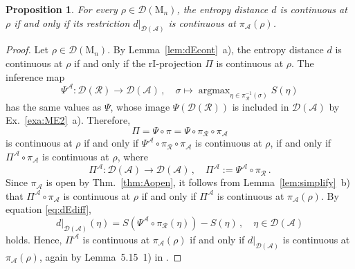 \documentclass[a4paper,11pt,reqno]{amsart}
\newcommand{\M}{\mathrm{M}}
\newcommand{\cA}{\mathcal{A}}
\newcommand{\cD}{\mathcal{D}}
\newcommand{\cR}{\mathcal{R}}
\DeclareMathOperator\argmax{argmax}
\newtheorem{prop}[thm]{Proposition}
\theoremstyle{definition}
\theoremstyle{remark}
\numberwithin{equation}{section}
\begin{document}
%
\begin{prop}\label{pro:simp-d}
For every $\rho\in\cD(\M_n)$, the entropy distance $d$ is continuous at $\rho$
if and only if its restriction $d|_{\cD(\cA)}$ is continuous at $\pi_\cA(\rho)$.
\end{prop}
%
\begin{proof}
Let $\rho\in\cD(\M_n)$. By Lemma~\ref{lem:dEcont}~a), the entropy distance $d$ 
is continuous at $\rho$ if and only if the rI-projection $\Pi$ is continuous at 
$\rho$. The inference map
\[\textstyle
\Psi^\cA:\cD(\cR)\to\cD(\cA)\,,
\quad
\sigma\mapsto\argmax_{\eta\in\pi_\cR^{-1}(\sigma)}S(\eta)
\]
has the same values as $\Psi$, whose image $\Psi(\cD(\cR))$ is included in 
$\cD(\cA)$ by Ex.~\ref{exa:ME2}~a). Therefore, 
\[
\Pi=\Psi\circ\pi=\Psi\circ\pi_\cR\circ\pi_\cA
\]
is continuous at $\rho$ if and only if $\Psi^\cA\circ\pi_\cR\circ\pi_\cA$ 
is continuous at $\rho$, if and only if $\Pi^\cA\circ\pi_\cA$ is 
continuous at $\rho$, where 
\[
\Pi^\cA:\cD(\cA)\to\cD(\cA)\,,
\quad
\Pi^\cA:=\Psi^\cA\circ\pi_\cR\,.
\]
Since $\pi_\cA$ is open by Thm.~\ref{thm:Aopen}, it follows from 
Lemma~\ref{lem:simplify}~b) that $\Pi^\cA\circ\pi_\cA$ is continuous at 
$\rho$ if and only if $\Pi^\cA$ is continuous at $\pi_\cA(\rho)$. By
equation \eqref{eq:dEdiff},  
\[
d|_{\cD(\cA)}(\eta)
=S(\Psi^\cA\circ\pi_\cR(\eta))-S(\eta)\,,
\quad
\eta\in\cD(\cA)
\]
holds. Hence, $\Pi^\cA$ is continuous at $\pi_\cA(\rho)$ if and only if 
$d|_{\cD(\cA)}$ is continuous at $\pi_\cA(\rho)$, again by Lemma~5.15~1)
in \cite{Weis2014}.
\end{proof}
%
\end{document}
